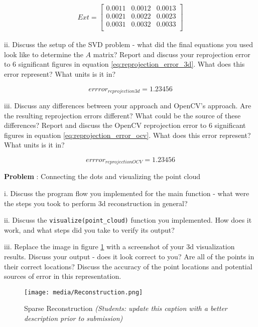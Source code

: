 \documentclass[onecolumn,10pt]{article}
\begin{document}
\begin{align}
Ext=\begin{bmatrix}
0.0011 & 0.0012 & 0.0013 \\
0.0021 & 0.0022 & 0.0023 \\
0.0031 & 0.0032 & 0.0033 \\
\end{bmatrix}
\label{eq:extrinsic_matrix}
\end{align}


ii. Discuss the setup of the SVD problem - what did the final equations you used look like to determine the $A$ matrix? Report and discuss your reprojection error to 6 significant figures in equation \ref{eq:reprojection_error_3d}. What does this error represent? What units is it in?

\begin{equation}
errror_{reprojection3d}=1.23456 \label{eq:reprojection_error_3d}
\end{equation}

iii. Discuss any differences between your approach and OpenCV's approach. Are the resulting reprojection errors different? What could be the source of these differences? Report and discuss the OpenCV reprojection error to 6 significant figures in equation \ref{eq:reprojection_error_ocv}. What does this error represent? What units is it in?

\begin{equation}
errror_{reprojectionOCV}=1.23456 \label{eq:reprojection_error_ocv}
\end{equation}


\addtocounter{problemnumber}{1}
\noindent\textbf{Problem }:  Connecting the dots and visualizing the point cloud

i. Discuss the program flow you implemented for the main function - what were the steps you took to perform 3d reconstruction in general?

ii. Discuss the \texttt{visualize(point\_cloud)} function you implemented. How does it work, and what steps did you take to verify its output?

iii. Replace the image in figure \ref{fig:reconstruction} with a screenshot of your 3d visualization results. Discuss your output - does it look correct to you? Are all of the points in their correct locations? Discuss the accuracy of the point locations and potential sources of error in this representation.

\begin{figure}
  \centering
  \texttt{[image: media/Reconstruction.png]} %
  \caption{Sparse Reconstruction \textit{(Students: update this caption with a better description prior to submission)}}
  \label{fig:reconstruction}
\end{figure}
\end{document}

